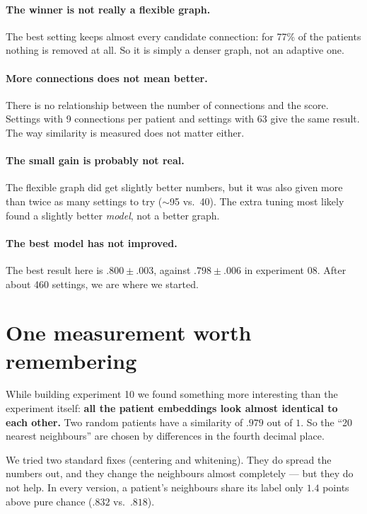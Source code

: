 \documentclass[11pt]{article}
\begin{document}
\paragraph{The winner is not really a flexible graph.} The best setting keeps almost every candidate
connection: for 77\% of the patients nothing is removed at all. So it is simply a denser graph, not an
adaptive one.

\paragraph{More connections does not mean better.} There is no relationship between the number of
connections and the score. Settings with 9 connections per patient and settings with 63 give the same
result. The way similarity is measured does not matter either.

\paragraph{The small gain is probably not real.} The flexible graph did get slightly better numbers,
but it was also given more than twice as many settings to try ($\sim$95 vs.\ 40). The extra tuning
most likely found a slightly better \emph{model}, not a better graph.

\paragraph{The best model has not improved.} The best result here is $.800 \pm .003$, against
$.798 \pm .006$ in experiment 08. After about 460 settings, we are where we started.

\section*{One measurement worth remembering}

While building experiment 10 we found something more interesting than the experiment itself:
\textbf{all the patient embeddings look almost identical to each other.} Two random patients have a
similarity of $.979$ out of $1$. So the ``20 nearest neighbours'' are chosen by differences in the
fourth decimal place.

We tried two standard fixes (centering and whitening). They do spread the numbers out, and they change
the neighbours almost completely --- but they do not help. In every version, a patient's neighbours
share its label only $1.4$ points above pure chance ($.832$ vs.\ $.818$).
\end{document}
